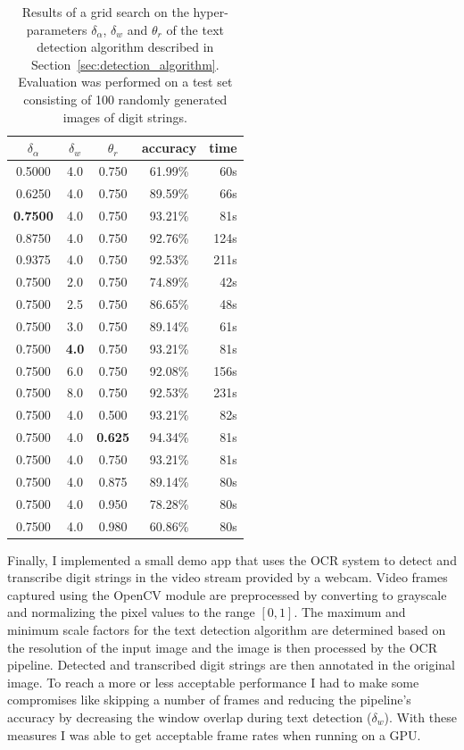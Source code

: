 \documentclass[12pt]{article}
\newcommand\secref[1]{Section~\ref{sec:#1}}
\begin{document}
\begin{table}[ht]
\centering
\caption{Results of a grid search on the hyper-parameters $\delta_\alpha$, $\delta_w$ and $\theta_r$
of the text detection algorithm described in \secref{detection_algorithm}.
Evaluation was performed on a test set consisting of 100 randomly generated images of digit strings.}
\label{tab:gridsearch}
\small
\begin{tabular}{|c|c|c|c|r|}
\hline
\rowcolor{lightgray}$\delta_\alpha$ & $\delta_w$ & $\theta_r$ & accuracy & time \\
\hline
0.5000  &  4.0  &  0.750  &  61.99\%  &  60s \\
0.6250  &  4.0  &  0.750  &  89.59\%  &  66s \\
\rowcolor{Honeydew2} {\bf 0.7500}  &  4.0  &  0.750  &  93.21\%  &  81s \\
0.8750  &  4.0  &  0.750  &  92.76\%  & 124s \\
0.9375  &  4.0  &  0.750  &  92.53\%  & 211s \\
\hline
0.7500  &  2.0  &  0.750  &  74.89\%  &  42s \\
0.7500  &  2.5  &  0.750  &  86.65\%  &  48s \\
0.7500  &  3.0  &  0.750  &  89.14\%  &  61s \\
\rowcolor{Honeydew2} 0.7500  &  {\bf 4.0}  &  0.750  &  93.21\%  &  81s \\
0.7500  &  6.0  &  0.750  &  92.08\%  & 156s \\
0.7500  &  8.0  &  0.750  &  92.53\%  & 231s \\
\hline
0.7500  &  4.0  &  0.500  &  93.21\%  &  82s \\
\rowcolor{Honeydew2} 0.7500  &  4.0  &  {\bf 0.625}  &  94.34\%  &  81s \\
0.7500  &  4.0  &  0.750  &  93.21\%  &  81s \\
0.7500  &  4.0  &  0.875  &  89.14\%  &  80s \\
0.7500  &  4.0  &  0.950  &  78.28\%  &  80s \\
0.7500  &  4.0  &  0.980  &  60.86\%  &  80s \\
\hline
\end{tabular}
\end{table}

Finally, I implemented a small demo app that uses the OCR system to detect and transcribe
digit strings in the video stream provided by a webcam. Video frames captured using
the OpenCV \cite{OpenCVOp84:online} module are preprocessed by converting to grayscale and
normalizing the pixel values to the range $[0,1]$. The maximum and minimum scale
factors for the text detection algorithm are determined based on the resolution of the
input image and the image is then processed by the OCR pipeline. Detected and transcribed
digit strings are then annotated in the original image. To reach a more or less acceptable
performance I had to make some compromises like skipping a number of frames and reducing
the pipeline's accuracy by decreasing the window overlap during text detection ($\delta_w$).
With these measures I was able to get acceptable frame rates when running on a GPU.
\end{document}
